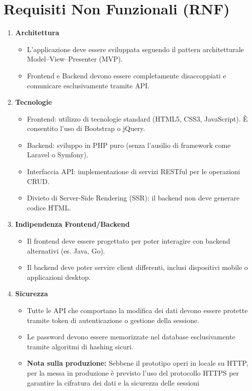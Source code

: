 \section{Requisiti Non Funzionali (RNF)}

\begin{enumerate}[label=\textbf{RNF\arabic*}, widest=RNF8, leftmargin=*, align=left]
    \item \textbf{Architettura}
        \begin{itemize}[nosep, leftmargin=0cm]
            \item L'applicazione deve essere sviluppata seguendo il pattern architetturale Model–View–Presenter (MVP).
            \item Frontend e Backend devono essere completamente disaccoppiati e comunicare esclusivamente tramite API.
        \end{itemize}

    \item \textbf{Tecnologie}
        \begin{itemize}[nosep, leftmargin=0cm]
            \item Frontend: utilizzo di tecnologie standard (HTML5, CSS3, JavaScript). È consentito l'uso di Bootstrap o jQuery.
            \item Backend: sviluppo in PHP puro (senza l'ausilio di framework come Laravel o Symfony).
            \item Interfaccia API: implementazione di servizi RESTful per le operazioni CRUD.
            \item Divieto di Server-Side Rendering (SSR): il backend non deve generare codice HTML.
        \end{itemize}

    \item \textbf{Indipendenza Frontend/Backend}
        \begin{itemize}[nosep, leftmargin=0cm]
            \item Il frontend deve essere progettato per poter interagire con backend alternativi (es. Java, Go).
            \item Il backend deve poter servire client differenti, inclusi dispositivi mobile o applicazioni desktop.
        \end{itemize}

    \item \textbf{Sicurezza}
        \begin{itemize}[nosep, leftmargin=0cm]
            \item Tutte le API che comportano la modifica dei dati devono essere protette tramite token di autenticazione o gestione della sessione.
            \item Le password devono essere memorizzate nel database esclusivamente tramite algoritmi di hashing sicuri.
            \item \textbf{Nota sulla produzione:} Sebbene il prototipo operi in locale su HTTP, per la messa in produzione è previsto l'uso del protocollo HTTPS per garantire la cifratura dei dati e la sicurezza delle sessioni
        \end{itemize}


\end{enumerate}
